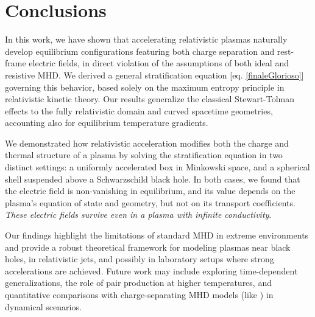 \documentclass[a4paper, amsfonts, amssymb, amsmath, reprint, showkeys, nofootinbib, twoside, onecolumn,notitlepage]{revtex4-1}
\theoremstyle{definition}
\theoremstyle{theorem}
\begin{document}

\vspace{-0.2cm}
\section{Conclusions}
\vspace{-0.2cm}


In this work, we have shown that accelerating relativistic plasmas naturally develop equilibrium configurations featuring both charge separation and rest-frame electric fields, in direct violation of the assumptions of both ideal and resistive MHD. We derived a general stratification equation [eq. \eqref{finaleGlorioso}] governing this behavior, based solely on the maximum entropy principle in relativistic kinetic theory. Our results generalize the classical Stewart-Tolman effects to the fully relativistic domain and curved spacetime geometries, accounting also for equilibrium temperature gradients.

We demonstrated how relativistic acceleration modifies both the charge and thermal structure of a plasma by solving the stratification equation in two distinct settings: a uniformly accelerated box in Minkowski space, and a spherical shell suspended above a Schwarzschild black hole. In both cases, we found that the electric field is non-vanishing in equilibrium, and its value depends on the plasma's equation of state and geometry, but not on its transport coefficients. 
\textit{These electric fields survive even in a plasma with infinite conductivity}.

Our findings highlight the limitations of standard MHD in extreme environments and provide a robust theoretical framework for modeling plasmas near black holes, in relativistic jets, and possibly in laboratory setups where strong accelerations are achieved. Future work may include exploring time-dependent generalizations, the role of pair production at higher temperatures, and quantitative comparisons with charge-separating MHD models (like \cite{GavassinoShokryMHD:2023qnw}) in dynamical scenarios.
\end{document}
